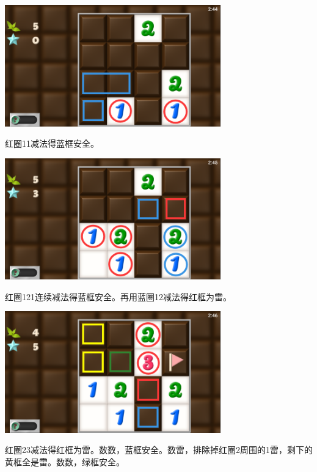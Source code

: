 \subsection{} %
\begin{center}
    \includegraphics[width=0.7\textwidth]{puzzle/33-1.png}
\end{center}
红圈11减法得蓝框安全。
\begin{center}
    \includegraphics[width=0.7\textwidth]{puzzle/33-2.png}
\end{center}
红圈121连续减法得蓝框安全。再用蓝圈12减法得红框为雷。
\begin{center}
    \includegraphics[width=0.7\textwidth]{puzzle/33-3.png}
\end{center}
红圈23减法得红框为雷。数数，蓝框安全。数雷，排除掉红圈2周围的1雷，剩下的黄框全是雷。数数，绿框安全。


